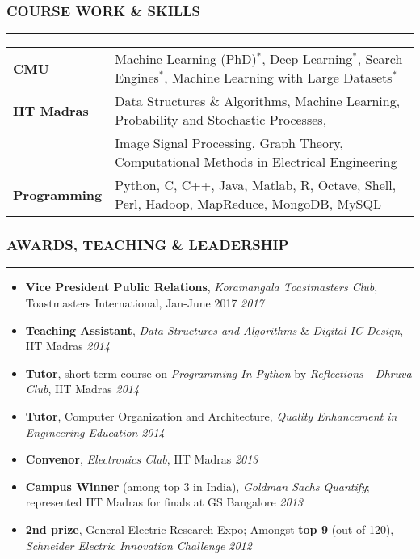 \documentclass[10pt,a4paper,English]{article}
\newcommand\roottitle[1]{\vspace{-4mm}\subsubsection*{\uppercase{#1}}\vspace{-0.3em}\nopagebreak[4]\hrule\vspace{4mm}}
\newcommand\itemyear[1]{\hfill \emph{\color{itemyear} #1}}
\newcommand\itemenv{\setlength\itemsep{0.5pt} \addtolength{\itemindent}{-5mm}\vspace{-1.5mm}}
\begin{document}
\roottitle{Course Work \& Skills}
\vspace{-2mm}
\renewcommand{\arraystretch}{1.2}
\setlength\tabcolsep{0pt}
\begin{tabularx}{\textwidth}{ l @{ - } X }
\textbf{CMU}                        & Machine Learning (PhD)$^*$, Deep Learning$^*$, Search Engines$^*$, Machine Learning with Large Datasets$^*$ \\
\textbf{IIT Madras}                 & Data Structures \& Algorithms, Machine Learning, Probability and Stochastic Processes, \\
                                    & Image Signal Processing, Graph Theory, Computational Methods in Electrical Engineering \\
\textbf{Programming}                & Python, C, C++, Java, Matlab, R, Octave, Shell, Perl, Hadoop, MapReduce, MongoDB, MySQL
\end{tabularx}
\vspace{2mm}

\roottitle{Awards, Teaching \& Leadership}
\begin{itemize} \itemenv
    \item \textbf{Vice President Public Relations}, \textit{Koramangala Toastmasters Club}, Toastmasters International, Jan-June 2017 \itemyear{2017}
    \item \textbf{Teaching Assistant}, \textit{Data Structures and Algorithms} \& \textit{Digital IC Design}, IIT Madras \itemyear{2014}
    \item \textbf{Tutor}, short-term course on \textit{Programming In Python} by \emph{Reflections - Dhruva Club}, IIT Madras \itemyear{2014}
    \item \textbf{Tutor}, Computer Organization and Architecture, \emph{Quality Enhancement in Engineering Education} \itemyear{2014}
    \item \textbf{Convenor}, \textit{Electronics Club}, IIT Madras \itemyear{2013}
    \item \textbf{Campus Winner} (among top {3} in India), \textit{Goldman Sachs Quantify}; represented IIT Madras for finals at GS Bangalore \itemyear{2013}
    \item \textbf{2nd prize}, General Electric Research Expo; Amongst \textbf{top 9} (out of 120), \textit{Schneider Electric Innovation Challenge} \itemyear{2012}
\end{itemize}
\vspace{1mm}

\noindent {}
\end{document}
